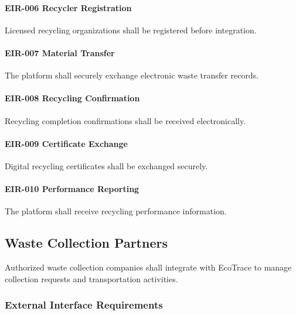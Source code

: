 \paragraph{EIR-006 Recycler Registration}

Licensed recycling organizations shall be registered before integration.

\paragraph{EIR-007 Material Transfer}

The platform shall securely exchange electronic waste transfer records.

\paragraph{EIR-008 Recycling Confirmation}

Recycling completion confirmations shall be received electronically.

\paragraph{EIR-009 Certificate Exchange}

Digital recycling certificates shall be exchanged securely.

\paragraph{EIR-010 Performance Reporting}

The platform shall receive recycling performance information.


\subsection{Waste Collection Partners}

Authorized waste collection companies shall integrate with EcoTrace to
manage collection requests and transportation activities.


\subsubsection*{External Interface Requirements}

